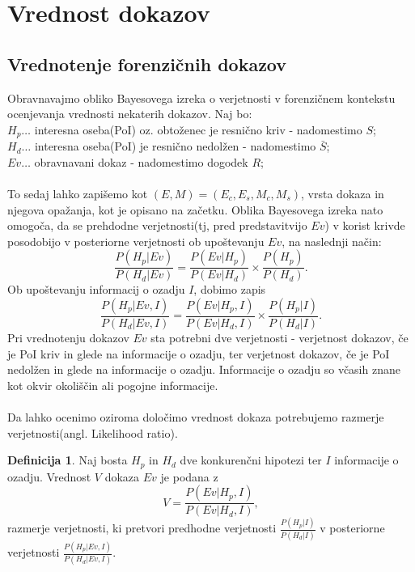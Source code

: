 \documentclass[12pt,a4paper]{amsart}
\theoremstyle{definition} %
\newtheorem{definicija}{Definicija}[section]
\theoremstyle{plain} %
\begin{document}
\section{Vrednost dokazov}

\subsection{Vrednotenje forenzičnih dokazov}
Obravnavajmo obliko Bayesovega izreka o verjetnosti v forenzičnem kontekstu ocenjevanja vrednosti nekaterih dokazov. Naj bo:\\
$H_p \dots$ interesna oseba(PoI) oz. obtoženec je resnično kriv - nadomestimo $S$;\\
$H_d \dots$ interesna oseba(PoI) je resnično nedolžen - nadomestimo $\bar{S}$;\\
$Ev \dots$ obravnavani dokaz - nadomestimo dogodek $R$;\\\\
To sedaj lahko zapišemo kot $(E, M) = (E_c, E_s, M_c, M_s)$, vrsta dokaza in njegova opažanja, kot je opisano na začetku. Oblika Bayesovega izreka nato omogoča, 
da se prehdodne verjetnosti(tj, pred predstavitvijo $Ev$) v korist krivde posodobijo v posteriorne verjetnosti ob upoštevanju $Ev$, na naslednji način:
\[
    \frac{P(H_p \lvert Ev)}{P(H_d \lvert Ev)} = \frac{P(Ev \lvert H_p)}{P(Ev \lvert H_d)} \times \frac{P(H_p)}{P(H_d)}.
\]
Ob upoštevanju informacij o ozadju $I$, dobimo zapis
\[
    \frac{P(H_p \lvert Ev, I)}{P(H_d \lvert Ev, I)} = \frac{P(Ev \lvert H_p, I)}{P(Ev \lvert H_d, I)} \times \frac{P(H_p \lvert I)}{P(H_d \lvert I)}.
\]
Pri vrednotenju dokazov $Ev$ sta potrebni dve verjetnosti - verjetnost dokazov, če je PoI kriv in glede na informacije o ozadju, ter verjetnost dokazov, če je PoI nedolžen in glede na informacije o ozadju. Informacije 
o ozadju so včasih znane kot okvir okoliščin ali pogojne informacije. \\\\
Da lahko ocenimo oziroma določimo vrednost dokaza potrebujemo razmerje verjetnosti(angl. Likelihood ratio).
\begin{definicija}
    Naj bosta  $H_p$ in $H_d$ dve konkurenčni hipotezi ter $I$ informacije o ozadju. Vrednost $V$ dokaza $Ev$ je podana z 
    \[
        V = \frac{P(Ev \lvert H_p, I)}{P(Ev \lvert H_d, I)},
    \]
    razmerje verjetnosti, ki pretvori predhodne verjetnosti $\frac{P(H_p \lvert I)}{P(H_d \lvert I)}$ v posteriorne verjetnosti $\frac{P(H_p \lvert Ev, I)}{P(H_d \lvert Ev, I)}$.
\end{definicija}
\end{document}
